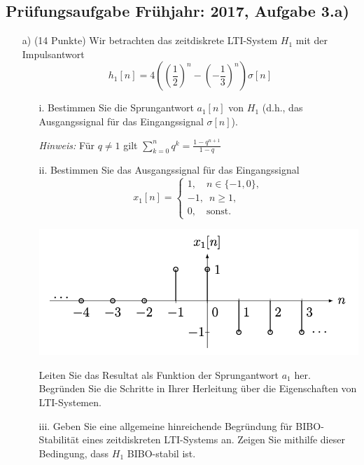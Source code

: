 \documentclass[11pt]{article}
\begin{document}
\subsection*{Prüfungsaufgabe Frühjahr: 2017, Aufgabe 3.a)}
\begin{itemize}
    \item[a)] (14 Punkte) Wir betrachten das zeitdiskrete LTI-System $H_1$ mit der Impulsantwort
    $$h_1[n] = 4 \left( \left( \frac{1}{2}\right)^n - \left(-\frac{1}{3} \right)^n \right)\sigma[n]$$
    \begin{itemize}
        \item[i.] Bestimmen Sie die Sprungantwort $a_1[n]$ von $H_1$ (d.h., das Ausgangssignal für das Eingangssignal $\sigma[n]$).
        \item[] \textit{Hinweis:} Für $q \neq 1$ gilt 
        $\displaystyle\sum_{k=0}^n q^k = \frac{1-q^{n+1}}{1-q}$
        \item[ii.] Bestimmen Sie das Ausgangssignal für das Eingangssignal
        $$x_1[n] = \begin{cases}
            1, \hspace{12pt} n \in \{-1,0\},\\
            -1, \hspace{6pt} n \geq 1,\\
            0, \hspace{12pt} \text{sonst.}
        \end{cases}$$
        \item[] \begin{center}
            \includegraphics[width=0.7\linewidth]{docimgs/Fruehjahr_17.png}
        \end{center}
        \item[] Leiten Sie das Resultat als Funktion der Sprungantwort $a_1$ her. Begründen Sie die Schritte in Ihrer Herleitung über die Eigenschaften von LTI-Systemen.
    \end{itemize}
\end{itemize}

\vfill \null
\pagebreak

\begin{itemize}
    \item[] \begin{itemize}
        \item[iii.] Geben Sie eine allgemeine hinreichende Begründung für BIBO-Stabilität eines zeitdiskreten LTI-Systems an. Zeigen Sie mithilfe dieser Bedingung, dass $H_1$ BIBO-stabil ist.
    \end{itemize}
\end{itemize}
\end{document}
